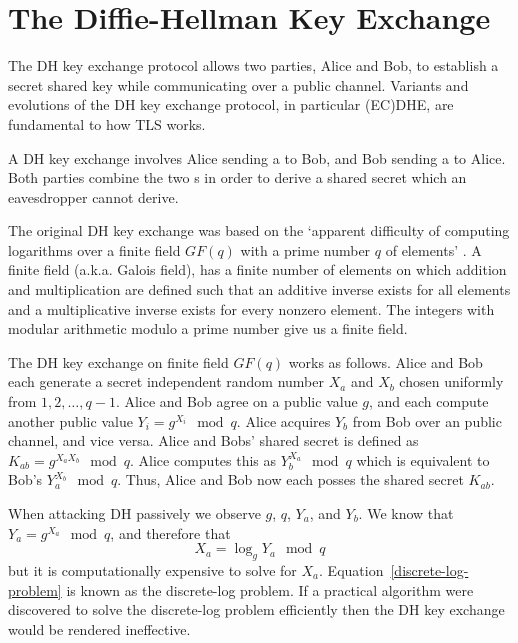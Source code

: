 \section{ The Diffie-Hellman Key Exchange }
The \ac{DH} key exchange protocol \citep{diffie-hellman-1976} allows two parties, Alice and Bob, to establish a secret shared key
while communicating over a public channel.
Variants and evolutions of the \ac{DH} key exchange protocol, in particular (\ac{EC})\ac{DHE},
are fundamental to how \ac{TLS} works.

A \ac{DH} key exchange involves Alice sending a  to Bob, and Bob sending a  to Alice. Both parties combine the two s in order to derive a shared secret which an eavesdropper cannot derive.

The original \ac{DH} key exchange was based on the
`apparent difficulty of computing logarithms over a finite field $GF(q)$ with a prime number $q$ of elements' \cite[p. 8]{diffie-hellman-1976}.
A finite field (a.k.a. Galois field), has a finite number of elements on which addition and multiplication are defined such that an additive inverse exists for all
elements and a multiplicative inverse exists for every nonzero element.
The integers with modular arithmetic modulo a prime number give us a finite field.

The \ac{DH} key exchange on finite field $GF(q)$ works as follows.
Alice and Bob each generate a secret independent random number $X_a$ and $X_b$ chosen uniformly from ${1,2,\dots,q-1}$.
Alice and Bob agree on a public value $g$, and each compute another public value $Y_i=g^{X_i}\mod q$.
Alice acquires $Y_b$ from Bob over an public channel, and vice versa.
Alice and Bobs' shared secret is defined as $K_{ab}=g^{X_aX_b}\mod q$.
Alice computes this as $Y_b^{X_a}\mod q$ which is equivalent to Bob's $Y_a^{X_b}\mod q$.
Thus, Alice and Bob now each posses the shared secret $K_{ab}$.

When attacking \ac{DH} passively we observe $g$, $q$, $Y_a$, and $Y_b$.
We know that $Y_a=g^{X_a}\mod q$, and therefore that
\begin{equation}
\label{discrete-log-problem}
X_a=\log_g Y_a \mod q
\end{equation}
but it is computationally expensive to solve for $X_a$.
Equation~\ref{discrete-log-problem} is known as the discrete-log problem.
If a practical algorithm were discovered to solve the discrete-log problem efficiently then the \ac{DH} key exchange would be rendered ineffective.

